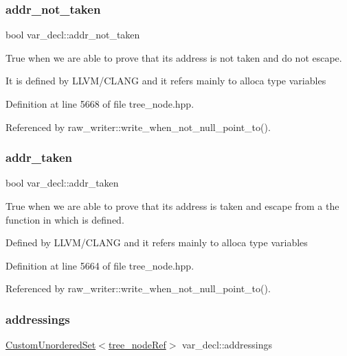 \subsubsection{\texorpdfstring{addr\+\_\+not\+\_\+taken}{addr\_not\_taken}}
{\footnotesize\ttfamily bool var\+\_\+decl\+::addr\+\_\+not\+\_\+taken}



True when we are able to prove that its address is not taken and do not escape. 

It is defined by L\+L\+V\+M/\+C\+L\+A\+NG and it refers mainly to alloca type variables 

Definition at line 5668 of file tree\+\_\+node.\+hpp.



Referenced by raw\+\_\+writer\+::write\+\_\+when\+\_\+not\+\_\+null\+\_\+point\+\_\+to().

\mbox{\label{structvar__decl_a8573104e8a30d9d2ba0e3b0414ee668d}} 
\subsubsection{\texorpdfstring{addr\+\_\+taken}{addr\_taken}}
{\footnotesize\ttfamily bool var\+\_\+decl\+::addr\+\_\+taken}



True when we are able to prove that its address is taken and escape from a the function in which is defined. 

Defined by L\+L\+V\+M/\+C\+L\+A\+NG and it refers mainly to alloca type variables 

Definition at line 5664 of file tree\+\_\+node.\+hpp.



Referenced by raw\+\_\+writer\+::write\+\_\+when\+\_\+not\+\_\+null\+\_\+point\+\_\+to().

\mbox{\label{structvar__decl_aad131efeb073923ab8445dc89e6536fb}} 
\subsubsection{\texorpdfstring{addressings}{addressings}}
{\footnotesize\ttfamily \hyperlink{classCustomUnorderedSet}{Custom\+Unordered\+Set}$<$\hyperlink{tree__node_8hpp_a6ee377554d1c4871ad66a337eaa67fd5}{tree\+\_\+node\+Ref}$>$ var\+\_\+decl\+::addressings}



